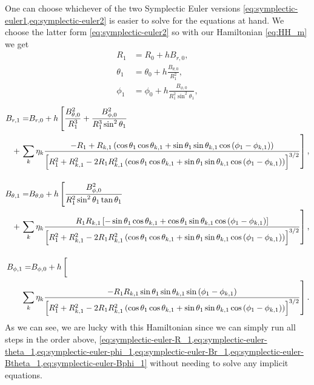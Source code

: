 One can choose whichever of the two Symplectic Euler versions \cref{eq:symplectic-euler1,eq:symplectic-euler2} is easier to solve for the equations at hand. We choose the latter form \cref{eq:symplectic-euler2} so with our Hamiltonian \cref{eq:HH_m} we get
\begin{align}
    R_1 &= R_0 + h B_{r,0} \label{eq:symplectic-euler-R_1}, \\[0.4cm]
    \theta_1 &= \theta_0 + h \frac{B_{\theta,0}}{R_1^2}, \label{eq:symplectic-euler-theta_1} \\[0.4cm]
    \phi_1 &= \phi_0 + h \frac{B_{\phi,0}}{R_1^2 \sin^2{\theta_1}}, \label{eq:symplectic-euler-phi_1}
\end{align}
\begin{align}    
    \begin{aligned}
        B_{r,1} = & B_{r,0} + h \left[ \frac{B_{\theta,0}^2}{R_1^3} + \frac{B_{\phi,0}^2}{R_1^3 \sin^2{\theta_1}} \right. \\
        & \hspace{-21.0pt} + \left. \sum\limits_{k} \eta_k \frac{-R_1 + R_{k,1} \left(\cos{\theta_1}\cos{\theta_{k,1}} + \sin{\theta_1}\sin{\theta_{k,1}}\cos{(\phi_1 - \phi_{k,1})}\right)}{\left[R_1^2 + R_{k,1}^2 -2 R_1 R_{k,1}^2 \left(\cos{\theta_1}\cos{\theta_{k,1}} + \sin{\theta_1}\sin{\theta_{k,1}}\cos{(\phi_1 - \phi_{k,1})} \right) \right]^{3/2}} \right] , \label{eq:symplectic-euler-Br_1}
    \end{aligned} \\[0.4cm]
    \begin{aligned}
        B_{\theta,1} = & B_{\theta,0} + h \left[ \frac{B_{\phi,0}^2}{R_1^2 \sin^2{\theta_1} \tan{\theta_1}} \right. \\
        & \hspace{-21.0pt} + \left. \sum\limits_{k} \eta_k \frac{R_1 R_{k,1} \left[-\sin{\theta_1}\cos{\theta_{k,1}} + \cos{\theta_1}\sin{\theta_{k,1}}\cos{(\phi_1 - \phi_{k,1})} \right]}{\left[R_1^2 + R_{k,1}^2 -2 R_1 R_{k,1}^2 \left(\cos{\theta_1}\cos{\theta_{k,1}} + \sin{\theta_1}\sin{\theta_{k,1}}\cos{(\phi_1 - \phi_{k,1})} \right) \right]^{3/2}} \right], \label{eq:symplectic-euler-Btheta_1}
    \end{aligned} \\[0.4cm]
    \begin{aligned}
        B_{\phi,1} = & B_{\phi,0} + h \left[ \vphantom{\frac12} \right.\\
        & \hspace{-21.0pt} \hphantom{+} \left. \sum\limits_{k} \eta_k \frac{- R_1 R_{k,1} \sin{\theta_1}\sin{\theta_{k,1}}\sin{(\phi_1 - \phi_{k,1})}}{\left[R_1^2 + R_{k,1}^2 -2 R_1 R_{k,1}^2 \left(\cos{\theta_1}\cos{\theta_{k,1}} + \sin{\theta_1}\sin{\theta_{k,1}}\cos{(\phi_1 - \phi_{k,1})} \right) \right]^{3/2}} \right]. \label{eq:symplectic-euler-Bphi_1}
    \end{aligned}
\end{align}
As we can see, we are lucky with this Hamiltonian since we can simply run all steps in the order above, \cref{eq:symplectic-euler-R_1,eq:symplectic-euler-theta_1,eq:symplectic-euler-phi_1,eq:symplectic-euler-Br_1,eq:symplectic-euler-Btheta_1,eq:symplectic-euler-Bphi_1} without needing to solve any implicit equations.

